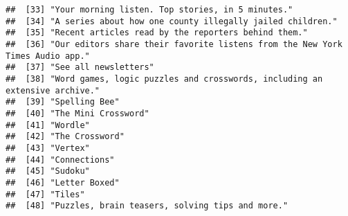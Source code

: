 \documentclass[
]{article}
\begin{document}
\begin{verbatim}
##  [33] "Your morning listen. Top stories, in 5 minutes."                                                                                                          
##  [34] "A series about how one county illegally jailed children."                                                                                                 
##  [35] "Recent articles read by the reporters behind them."                                                                                                       
##  [36] "Our editors share their favorite listens from the New York Times Audio app."                                                                              
##  [37] "See all newsletters"                                                                                                                                      
##  [38] "Word games, logic puzzles and crosswords, including an extensive archive."                                                                                
##  [39] "Spelling Bee"                                                                                                                                             
##  [40] "The Mini Crossword"                                                                                                                                       
##  [41] "Wordle"                                                                                                                                                   
##  [42] "The Crossword"                                                                                                                                            
##  [43] "Vertex"                                                                                                                                                   
##  [44] "Connections"                                                                                                                                              
##  [45] "Sudoku"                                                                                                                                                   
##  [46] "Letter Boxed"                                                                                                                                             
##  [47] "Tiles"                                                                                                                                                    
##  [48] "Puzzles, brain teasers, solving tips and more."                                                                                                           

\end{verbatim}
\end{document}
